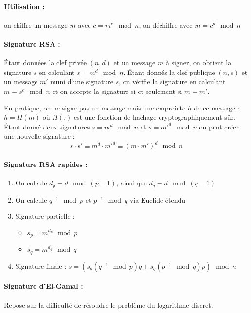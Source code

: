 \documentclass[11pt,a4paper]{report}
\begin{document}
\paragraph*{Utilisation :} on chiffre un message $m$ avec $c=m^e\mod n$, on déchiffre avec $m =c^d\mod n$

\paragraph*{Signature RSA :}

Étant données la clef privée $(n,d)$ et un message $m$ à signer, on obtient la signature $s$ en calculant $s=m^d\mod n$. Étant donnés la clef publique $(n,e)$ et un message $m'$ muni d'une signature $s$, on vérifie la signature en calculant $m=s^e\mod n$ et on accepte la signature si et seulement si $m=m'$.

En pratique, on ne signe pas un message mais une empreinte $h$ de ce message : $h=H(m)$ où $H(.)$ est une fonction de hachage cryptographiquement sûr. Étant donné deux signatures $s=m^d\mod n$ et $s=m'^d\mod n$ on peut créer une nouvelle signature :
$$
s \cdot s' \equiv m^d \cdot m'^d \equiv (m\cdot m')^d \mod n 
$$

\paragraph*{Signature RSA rapides :}

\begin{enumerate}
    \item On calcule $d_p=d\mod (p-1)$, ainsi que $d_q=d\mod (q-1)$
    \item On calcule $q^{-1}\mod p$ et $p^{-1}\mod q$ via Euclide étendu
    \item Signature partielle :
    \begin{itemize}
        \item $s_p = m^{d_p} \mod p$
        \item $s_q = m^{d_q} \mod q$
    \end{itemize}
    \item Signature finale : $s=(s_p(q^{-1} \mod p)q+s_q(p^{-1} \mod q)p) \mod n$
    \end{enumerate}

\paragraph*{Signature d'El-Gamal :}

Repose sur la difficulté de résoudre le problème du logarithme discret.
\end{document}

